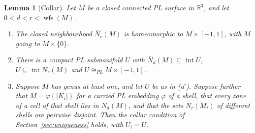 \documentclass[preprint,12pt]{elsarticle}
\newtheorem{lemma}[theorem]{Lemma}
\theoremstyle{definition}
\theoremstyle{remark}
\newcommand{\R}{\mathbb{R}}
\newcommand{\wfs}{\operatorname{wfs}}
\newcommand{\inter}{\operatorname{int}}
\begin{document}
\begin{lemma}[Collar]\label{lem:collar}
Let $M$ be a closed connected PL surface in $\R^3$, and let $0<d<r<\wfs(M)$.
\begin{enumerate}
\item[(a)] The closed neighbourhood $\bar N_r(M)$ is homeomorphic to $M\times[-1,1]$, with $M$ going to
$M\times\{0\}$.
\item[(a$'$)] There is a compact PL submanifold $U$ with $\bar N_d(M)\subseteq\inter U$, $U\subseteq\inter\bar
N_r(M)$ and $U\cong_{PL}M\times[-1,1]$.
\item[(b)] Suppose $M$ has genus at least one, and let $U$ be as in (a$'$). Suppose further that $M=\varphi(|K_i|)$ for a carried PL embedding $\varphi$ of a
shell, that every zone of a cell of that shell lies in $N_d(M)$, and that the sets $\bar N_r(M_i)$ of different shells
are pairwise disjoint. Then the collar condition of Section~\ref{sec:uniqueness} holds, with $U_i=U$.
\end{enumerate}
\end{lemma}
\end{document}
